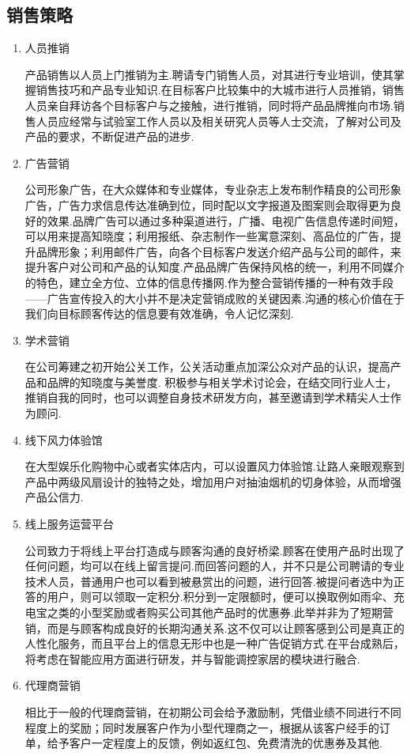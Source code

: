 \subsection{销售策略}
\begin{enumerate}
\item 人员推销

      产品销售以人员上门推销为主.聘请专门销售人员，对其进行专业培训，使其掌握销售技巧和产品专业知识.在目标客户比较集中的大城市进行人员推销，销售人员亲自拜访各个目标客户与之接触，进行推销，同时将产品品牌推向市场.销售人员应经常与试验室工作人员以及相关研究人员等人士交流，了解对公司及产品的要求，不断促进产品的进步.

\item 广告营销

      公司形象广告，在大众媒体和专业媒体，专业杂志上发布制作精良的公司形象广告，广告力求信息传达准确到位，同时配以文字报道及图案则会取得更为良好的效果.品牌广告可以通过多种渠道进行，广播、电视广告信息传递时间短，可以用来提高知晓度；利用报纸、杂志制作一些寓意深刻、高品位的广告，提升品牌形象；利用邮件广告，向各个目标客户发送介绍产品与公司的邮件，来提升客户对公司和产品的认知度.产品品牌广告保持风格的统一，利用不同媒介的特色，建立全方位、立体的信息传播网.作为整合营销传播的一种有效手段——广告宣传投入的大小并不是决定营销成败的关键因素.沟通的核心价值在于我们向目标顾客传达的信息要有效准确，令人记忆深刻.

\item 学术营销

      在公司筹建之初开始公关工作，公关活动重点加深公众对产品的认识，提高产品和品牌的知晓度与美誉度.
      积极参与相关学术讨论会，在结交同行业人士，推销自我的同时，也可以调整自身技术研发方向，甚至邀请到学术精尖人士作为顾问.

\item 线下风力体验馆

      在大型娱乐化购物中心或者实体店内，可以设置风力体验馆.让路人亲眼观察到产品中两级风扇设计的独特之处，增加用户对抽油烟机的切身体验，从而增强产品公信力.

\item 线上服务运营平台

      公司致力于将线上平台打造成与顾客沟通的良好桥梁.顾客在使用产品时出现了任何问题，均可以在线上留言提问.而回答问题的人，并不只是公司聘请的专业技术人员，普通用户也可以看到被悬赏出的问题，进行回答.被提问者选中为正答的用户，则可以领取一定积分.积分到一定限额时，便可以换取例如雨伞、充电宝之类的小型奖励或者购买公司其他产品时的优惠券.此举并非为了短期营销，而是与顾客构成良好的长期沟通关系.这不仅可以让顾客感到公司是真正的人性化服务，而且平台上的信息无形中也是一种广告促销方式.在平台成熟后，将考虑在智能应用方面进行研发，并与智能调控家居的模块进行融合.

\item 代理商营销

      相比于一般的代理商营销，在初期公司会给予激励制，凭借业绩不同进行不同程度上的奖励；同时发展客户作为小型代理商之一，根据从该客户经手的订单，给予客户一定程度上的反馈，例如返红包、免费清洗的优惠券及其他.

\end{enumerate}

